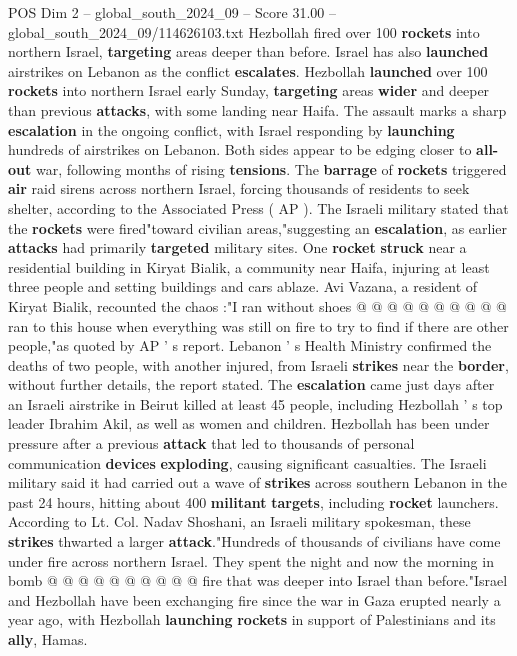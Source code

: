 \begin{textsample}{POS Dim 2 – global\_south\_2024\_09 – Score 31.00 – global\_south\_2024\_09/114626103.txt}  \label{ex:f2_pos_040}
Hezbollah fired over 100 \textbf{rockets} into northern Israel, \textbf{targeting} areas deeper than before.
Israel has also \textbf{launched} airstrikes on Lebanon as the conflict \textbf{escalates}.
Hezbollah \textbf{launched} over 100 \textbf{rockets} into northern Israel early Sunday, \textbf{targeting} areas \textbf{wider} and deeper than previous \textbf{attacks}, with some landing near Haifa.
The assault marks a sharp \textbf{escalation} in the ongoing conflict, with Israel responding by \textbf{launching} hundreds of airstrikes on Lebanon.
Both sides appear to be edging closer to \textbf{all-out} war, following months of rising \textbf{tensions}.
The \textbf{barrage} of \textbf{rockets} triggered \textbf{air} raid sirens across northern Israel, forcing thousands of residents to seek shelter, according to the Associated Press ( AP ).
The Israeli military stated that the \textbf{rockets} were fired"toward civilian areas,"suggesting an \textbf{escalation}, as earlier \textbf{attacks} had primarily \textbf{targeted} military sites.
One \textbf{rocket} \textbf{struck} near a residential building in Kiryat Bialik, a community near Haifa, injuring at least three people and setting buildings and cars ablaze.
Avi Vazana, a resident of Kiryat Bialik, recounted the chaos :"I ran without shoes @ @ @ @ @ @ @ @ @ @ ran to this house when everything was still on fire to try to find if there are other people,"as quoted by AP ' s report.
Lebanon ' s Health Ministry confirmed the deaths of two people, with another injured, from Israeli \textbf{strikes} near the \textbf{border}, without further details, the report stated.
The \textbf{escalation} came just days after an Israeli airstrike in Beirut killed at least 45 people, including Hezbollah ' s top leader Ibrahim Akil, as well as women and children.
Hezbollah has been under pressure after a previous \textbf{attack} that led to thousands of personal communication \textbf{devices} \textbf{exploding}, causing significant casualties.
The Israeli military said it had carried out a wave of \textbf{strikes} across southern Lebanon in the past 24 hours, hitting about 400 \textbf{militant} \textbf{targets}, including \textbf{rocket} launchers.
According to Lt.
Col.
Nadav Shoshani, an Israeli military spokesman, these \textbf{strikes} thwarted a larger \textbf{attack}."Hundreds of thousands of civilians have come under fire across northern Israel.
They spent the night and now the morning in bomb @ @ @ @ @ @ @ @ @ @ fire that was deeper into Israel than before."Israel and Hezbollah have been exchanging fire since the war in Gaza erupted nearly a year ago, with Hezbollah \textbf{launching} \textbf{rockets} in support of Palestinians and its \textbf{ally}, Hamas.

\end{textsample}

